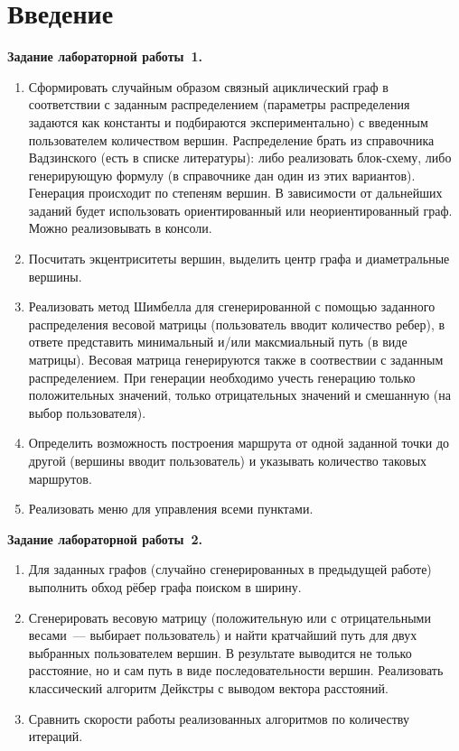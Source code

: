 \section*{Введение}

\textbf{Задание лабораторной работы~1.}
\begin{enumerate}
    \item Сформировать случайным образом связный ациклический граф в соответствии с заданным распределением (параметры распределения задаются как константы и подбираются экспериментально) с введенным пользователем количеством вершин. Распределение брать из справочника Вадзинского (есть в списке литературы): либо реализовать блок-схему, либо генерирующую формулу (в справочнике дан один из этих вариантов). Генерация происходит по степеням вершин. В зависимости от дальнейших заданий будет использовать ориентированный или неориентированный граф. Можно реализовывать в консоли.

    \item Посчитать экцентриситеты вершин, выделить центр графа и диаметральные вершины.

    \item Реализовать метод Шимбелла для сгенерированной с помощью заданного распределения весовой матрицы  (пользователь вводит количество ребер), в ответе представить минимальный и/или максмиальный путь  (в виде матрицы). Весовая матрица генерируются также в соотвествии с заданным распределением. При генерации необходимо учесть генерацию только положительных значений, только отрицательных значений и смешанную (на выбор пользователя).

    \item Определить возможность построения маршрута от одной заданной точки до другой (вершины вводит пользователь) и указывать количество таковых маршрутов.

    \item Реализовать меню для управления всеми пунктами.
\end{enumerate}

\textbf{Задание лабораторной работы~2.}
\begin{enumerate}
    \item Для заданных графов (случайно сгенерированных в предыдущей работе)
    выполнить обход рёбер графа поиском в ширину.
    \item Сгенерировать весовую матрицу (положительную или с отрицательными
    весами~--- выбирает пользователь) и найти кратчайший путь для двух
    выбранных пользователем вершин. В результате выводится не только
    расстояние, но и сам путь в виде последовательности вершин.
    Реализовать классический алгоритм Дейкстры с выводом вектора расстояний.
    \item Сравнить скорости работы реализованных алгоритмов по количеству
    итераций.
\end{enumerate}

